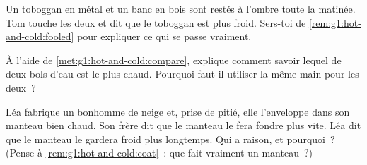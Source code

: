 \begin{exercise}[$\star$]\label{exo:g1:hot-and-cold:7}
Un toboggan en métal et un banc en bois sont restés à l'ombre toute
la matinée. Tom touche les deux et dit que le toboggan est plus
froid. Sers-toi de \cref{rem:g1:hot-and-cold:fooled} pour expliquer
ce qui se passe vraiment.
\end{exercise}

\begin{exercise}[$\star$]\label{exo:g1:hot-and-cold:8}
À l'aide de \cref{met:g1:hot-and-cold:compare}, explique comment
savoir lequel de deux bols d'eau est le plus chaud. Pourquoi
faut-il utiliser la même main pour les deux~?
\end{exercise}

\begin{exercise}[$\star\star$]\label{exo:g1:hot-and-cold:9}
Léa fabrique un bonhomme de neige et, prise de pitié, elle
l'enveloppe dans son manteau bien chaud. Son frère dit que le manteau
le fera fondre plus vite. Léa dit que le manteau le gardera froid
plus longtemps. Qui a raison, et pourquoi~? (Pense à
\cref{rem:g1:hot-and-cold:coat}~: que fait vraiment un manteau~?)
\end{exercise}
